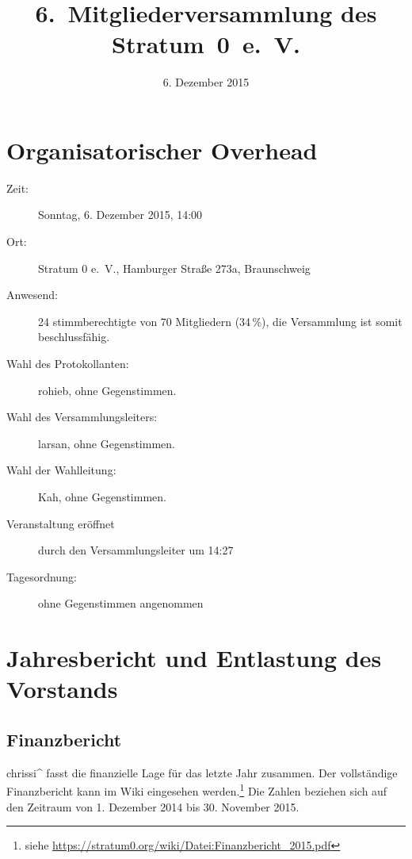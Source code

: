 \documentclass[a4paper,12pt]{scrartcl}
\title{6.~Mitgliederversammlung des Stratum~0~e.~V.}
\date{6. Dezember 2015}
\begin{document}
\maketitle


\section{Organisatorischer Overhead}
\begin{description}
  \item[Zeit:] Sonntag, 6. Dezember 2015, 14:00
  \item[Ort:] Stratum 0 e.~V., Hamburger Straße 273a, Braunschweig
  \item[Anwesend:] 24 stimmberechtigte von 70 Mitgliedern (34\,\%), die Versammlung
    ist somit beschlussfähig.
  \item[Wahl des Protokollanten:] rohieb, ohne Gegenstimmen.
  \item[Wahl des Versammlungsleiters:] larsan, ohne Gegenstimmen.
	\item[Wahl der Wahlleitung:] Kah, ohne Gegenstimmen.
  \item[Veranstaltung eröffnet] durch den Versammlungsleiter um 14:27
  \item[Tagesordnung:] ohne Gegenstimmen angenommen
\end{description}


\section{Jahresbericht und Entlastung des Vorstands}

\subsection{Finanzbericht}
chrissi\textasciicircum{} fasst die finanzielle Lage für das letzte Jahr
zusammen.  Der vollständige Finanzbericht kann im Wiki eingesehen
werden.\footnote{siehe
\url{https://stratum0.org/wiki/Datei:Finanzbericht_2015.pdf}}
Die Zahlen beziehen sich auf den Zeitraum von 1. Dezember 2014 bis 30. November
2015.
\end{document}
